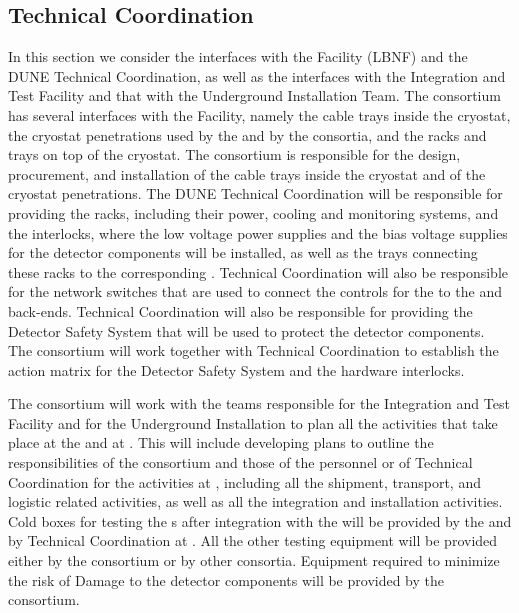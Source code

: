 \subsection{Technical Coordination}
\label{sec:fdsp-tpcelec-interfaces-tc}

In this section we consider the interfaces with the Facility (LBNF)
and the DUNE Technical Coordination, as well as the interfaces with
the Integration and Test Facility and that with the Underground
Installation Team. The  consortium has several
interfaces with the Facility, namely the cable trays inside the
cryostat, the cryostat penetrations used by the 
and by the  consortia, and the racks and trays on top
of the cryostat. The  consortium is responsible
for the design, procurement, and installation of the cable trays
inside the cryostat and of the cryostat penetrations. The DUNE
Technical Coordination will be responsible for providing the racks,
including their power, cooling and monitoring systems, and the interlocks,
where the low voltage power supplies and the bias voltage supplies
for the  detector components will be installed, as well as the trays
connecting these racks to the corresponding . Technical
Coordination will also be responsible for the network switches that
are used to connect the controls for the  to the
 and  back-ends. Technical Coordination will also be responsible
for providing the Detector Safety System that will be used to protect
the  detector components. The 
consortium will work together with Technical Coordination to establish
the action matrix for the Detector Safety System and the hardware
interlocks.

The  consortium will work with the teams responsible
for the Integration and Test Facility and for the Underground Installation
to plan all the activities that take place at the  and at
\surf. This will include developing plans to outline the responsibilities
of the consortium and those of the  personnel or of 
Technical Coordination for the activities at \surf, including all the
shipment, transport, and logistic related activities, as well as all
the integration and installation activities. Cold boxes for testing
the s after integration with the  will be 
provided by the  and by Technical Coordination at \surf.
All the other testing equipment will be provided either by the 
consortium or by other consortia. Equipment required to
minimize the risk of  Damage to the detector components
will  be provided by the  consortium. 

